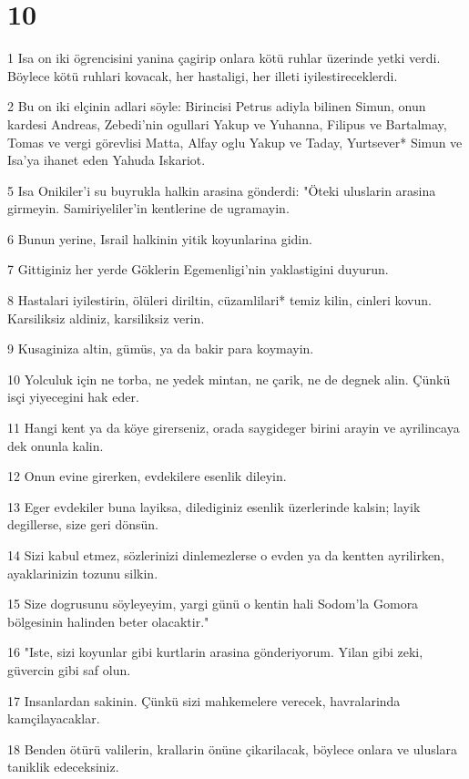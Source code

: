 \chapter{10}

\par 1 Isa on iki ögrencisini yanina çagirip onlara kötü ruhlar üzerinde yetki verdi. Böylece kötü ruhlari kovacak, her hastaligi, her illeti iyilestireceklerdi.
\par 2 Bu on iki elçinin adlari söyle: Birincisi Petrus adiyla bilinen Simun, onun kardesi Andreas, Zebedi'nin ogullari Yakup ve Yuhanna, Filipus ve Bartalmay, Tomas ve vergi görevlisi Matta, Alfay oglu Yakup ve Taday, Yurtsever* Simun ve Isa'ya ihanet eden Yahuda Iskariot.
\par 5 Isa Onikiler'i su buyrukla halkin arasina gönderdi: "Öteki uluslarin arasina girmeyin. Samiriyeliler'in kentlerine de ugramayin.
\par 6 Bunun yerine, Israil halkinin yitik koyunlarina gidin.
\par 7 Gittiginiz her yerde Göklerin Egemenligi'nin yaklastigini duyurun.
\par 8 Hastalari iyilestirin, ölüleri diriltin, cüzamlilari* temiz kilin, cinleri kovun. Karsiliksiz aldiniz, karsiliksiz verin.
\par 9 Kusaginiza altin, gümüs, ya da bakir para koymayin.
\par 10 Yolculuk için ne torba, ne yedek mintan, ne çarik, ne de degnek alin. Çünkü isçi yiyecegini hak eder.
\par 11 Hangi kent ya da köye girerseniz, orada saygideger birini arayin ve ayrilincaya dek onunla kalin.
\par 12 Onun evine girerken, evdekilere esenlik dileyin.
\par 13 Eger evdekiler buna layiksa, dilediginiz esenlik üzerlerinde kalsin; layik degillerse, size geri dönsün.
\par 14 Sizi kabul etmez, sözlerinizi dinlemezlerse o evden ya da kentten ayrilirken, ayaklarinizin tozunu silkin.
\par 15 Size dogrusunu söyleyeyim, yargi günü o kentin hali Sodom'la Gomora bölgesinin halinden beter olacaktir."
\par 16 "Iste, sizi koyunlar gibi kurtlarin arasina gönderiyorum. Yilan gibi zeki, güvercin gibi saf olun.
\par 17 Insanlardan sakinin. Çünkü sizi mahkemelere verecek, havralarinda kamçilayacaklar.
\par 18 Benden ötürü valilerin, krallarin önüne çikarilacak, böylece onlara ve uluslara taniklik edeceksiniz.
